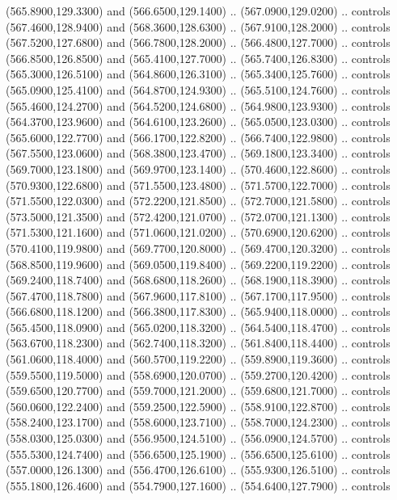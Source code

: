 {\begin{scope}[y=0.80pt, x=0.80pt, yscale=-1, xscale=1, inner sep=0pt, outer sep=0pt, #1]
      (565.8900,129.3300) and (566.6500,129.1400) .. (567.0900,129.0200) .. controls
      (567.4600,128.9400) and (568.3600,128.6300) .. (567.9100,128.2000) .. controls
      (567.5200,127.6800) and (566.7800,128.2000) .. (566.4800,127.7000) .. controls
      (566.8500,126.8500) and (565.4100,127.7000) .. (565.7400,126.8300) .. controls
      (565.3000,126.5100) and (564.8600,126.3100) .. (565.3400,125.7600) .. controls
      (565.0900,125.4100) and (564.8700,124.9300) .. (565.5100,124.7600) .. controls
      (565.4600,124.2700) and (564.5200,124.6800) .. (564.9800,123.9300) .. controls
      (564.3700,123.9600) and (564.6100,123.2600) .. (565.0500,123.0300) .. controls
      (565.6000,122.7700) and (566.1700,122.8200) .. (566.7400,122.9800) .. controls
      (567.5500,123.0600) and (568.3800,123.4700) .. (569.1800,123.3400) .. controls
      (569.7000,123.1800) and (569.9700,123.1400) .. (570.4600,122.8600) .. controls
      (570.9300,122.6800) and (571.5500,123.4800) .. (571.5700,122.7000) .. controls
      (571.5500,122.0300) and (572.2200,121.8500) .. (572.7000,121.5800) .. controls
      (573.5000,121.3500) and (572.4200,121.0700) .. (572.0700,121.1300) .. controls
      (571.5300,121.1600) and (571.0600,121.0200) .. (570.6900,120.6200) .. controls
      (570.4100,119.9800) and (569.7700,120.8000) .. (569.4700,120.3200) .. controls
      (568.8500,119.9600) and (569.0500,119.8400) .. (569.2200,119.2200) .. controls
      (569.2400,118.7400) and (568.6800,118.2600) .. (568.1900,118.3900) .. controls
      (567.4700,118.7800) and (567.9600,117.8100) .. (567.1700,117.9500) .. controls
      (566.6800,118.1200) and (566.3800,117.8300) .. (565.9400,118.0000) .. controls
      (565.4500,118.0900) and (565.0200,118.3200) .. (564.5400,118.4700) .. controls
      (563.6700,118.2300) and (562.7400,118.3200) .. (561.8400,118.4400) .. controls
      (561.0600,118.4000) and (560.5700,119.2200) .. (559.8900,119.3600) .. controls
      (559.5500,119.5000) and (558.6900,120.0700) .. (559.2700,120.4200) .. controls
      (559.6500,120.7700) and (559.7000,121.2000) .. (559.6800,121.7000) .. controls
      (560.0600,122.2400) and (559.2500,122.5900) .. (558.9100,122.8700) .. controls
      (558.2400,123.1700) and (558.6000,123.7100) .. (558.7000,124.2300) .. controls
      (558.0300,125.0300) and (556.9500,124.5100) .. (556.0900,124.5700) .. controls
      (555.5300,124.7400) and (556.6500,125.1900) .. (556.6500,125.6100) .. controls
      (557.0000,126.1300) and (556.4700,126.6100) .. (555.9300,126.5100) .. controls
      (555.1800,126.4600) and (554.7900,127.1600) .. (554.6400,127.7900) .. controls

\end{scope}}
